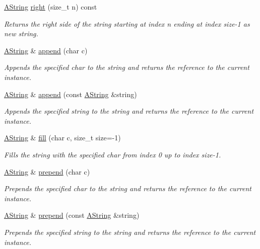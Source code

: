\begin{DoxyCompactItemize}
\mbox{\hyperlink{class_a_string}{A\+String}} \mbox{\hyperlink{class_a_string_aa1f94f677d3db968b09750755ffad121}{right}} (size\+\_\+t n) const
\begin{DoxyCompactList}\small\item\em Returns the right side of the string starting at index n ending at index size-\/1 as new string. \end{DoxyCompactList}\item 
\mbox{\hyperlink{class_a_string}{A\+String}} \& \mbox{\hyperlink{class_a_string_a7f87ec8aea6fbd0605ac5b987e8d2d6e}{append}} (char c)
\begin{DoxyCompactList}\small\item\em Appends the specified char to the string and returns the reference to the current instance. \end{DoxyCompactList}\item 
\mbox{\hyperlink{class_a_string}{A\+String}} \& \mbox{\hyperlink{class_a_string_aeac95119d8284d146b4b59ba773a351a}{append}} (const \mbox{\hyperlink{class_a_string}{A\+String}} \&string)
\begin{DoxyCompactList}\small\item\em Appends the specified string to the string and returns the reference to the current instance. \end{DoxyCompactList}\item 
\mbox{\hyperlink{class_a_string}{A\+String}} \& \mbox{\hyperlink{class_a_string_a8430996f2870ab0ffb4a00d7179fbc91}{fill}} (char c, size\+\_\+t size=-\/1)
\begin{DoxyCompactList}\small\item\em Fills the string with the specified char from index 0 up to index size-\/1. \end{DoxyCompactList}\item 
\mbox{\hyperlink{class_a_string}{A\+String}} \& \mbox{\hyperlink{class_a_string_a792e892cd6724764b3f279bbc23444c3}{prepend}} (char c)
\begin{DoxyCompactList}\small\item\em Prepends the specified char to the string and returns the reference to the current instance. \end{DoxyCompactList}\item 
\mbox{\hyperlink{class_a_string}{A\+String}} \& \mbox{\hyperlink{class_a_string_a0835a8afa3a490196003c11e23653e4a}{prepend}} (const \mbox{\hyperlink{class_a_string}{A\+String}} \&string)
\begin{DoxyCompactList}\small\item\em Prepends the specified string to the string and returns the reference to the current instance. \end{DoxyCompactList}\item 

\end{DoxyCompactItemize}
